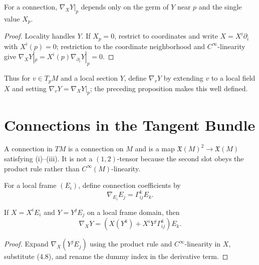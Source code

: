 \begin{proposition}\label{prop:covariant-deriv-dependence-at-point}
\leanok
For a connection, $\nabla_XY|_p$ depends only on the germ of $Y$ near $p$ and the single value $X_p$.
\end{proposition}
\begin{proof}
\leanok
\sketch Locality handles $Y$. If $X_p=0$, restrict to coordinates and write $X=X^i\partial_i$ with $X^i(p)=0$; restriction to the coordinate neighborhood and $C^\infty$-linearity give $\nabla_XY|_p=X^i(p)\nabla_{\partial_i}Y|_p=0$.
\end{proof}

Thus for $v\in T_pM$ and a local section $Y$, define $\nabla_vY$ by extending $v$ to a local field $X$ and setting $\nabla_vY=\nabla_XY|_p$; the preceding proposition makes this well defined.

\section{Connections in the Tangent Bundle}

A connection in $TM$ is a connection on $M$ and is a map $\mathfrak X(M)^2\to\mathfrak X(M)$ satisfying (i)--(iii). It is not a $(1,2)$-tensor because the second slot obeys the product rule rather than $C^\infty(M)$-linearity.

For a local frame $(E_i)$, define connection coefficients by
\begin{equation}
\nabla_{E_i}E_j=\Gamma^k_{ij}E_k.\tag{4.8}
\end{equation}
\begin{proposition}
\label{prop:connection-coefficients-frame}
\leanok
If $X=X^iE_i$ and $Y=Y^jE_j$ on a local frame domain, then
\begin{equation}
\nabla_XY=\left(X(Y^k)+X^iY^j\Gamma^k_{ij}\right)E_k.\tag{4.9}
\end{equation}
\end{proposition}
\begin{proof}
\sketch Expand $\nabla_X(Y^jE_j)$ using the product rule and $C^\infty$-linearity in $X$, substitute (4.8), and rename the dummy index in the derivative term.
\end{proof}

